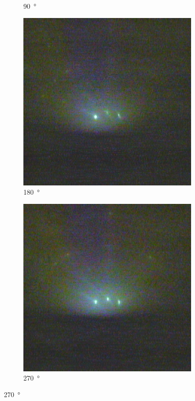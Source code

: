 \begin{figure}
\begin{subfigure}{0.2\linewidth}
        \caption{\qty{90}{\degree}}
    \end{subfigure}
    \begin{subfigure}{0.2\linewidth}
        \includegraphics[width=\textwidth]{../data/edited/1_1_187deg.pdf}
        \caption{\qty{180}{\degree}}
    \end{subfigure}
    \begin{subfigure}{0.2\linewidth}
        \includegraphics[width=\textwidth]{../data/edited/1_1_277deg.pdf}
        \caption{\qty{270}{\degree}}
    \end{subfigure}


\end{figure}
